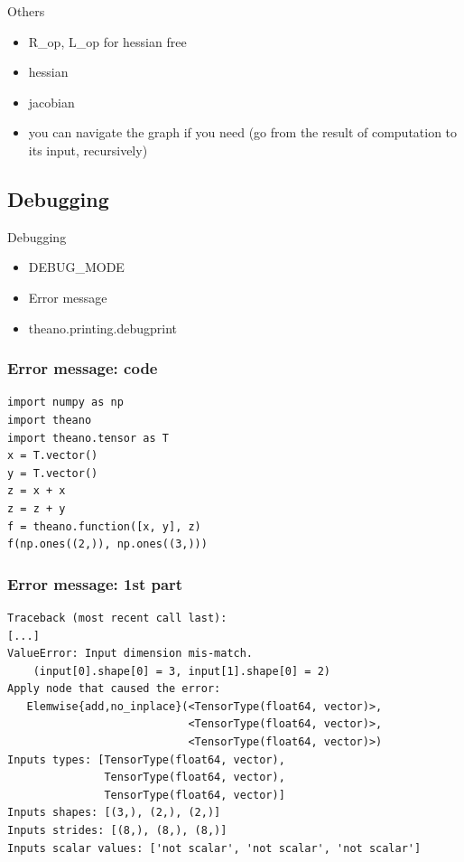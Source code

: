 \documentclass[utf8x,xcolor=pdftex,dvipsnames,table]{beamer}
\begin{document}
\begin{frame}{Others}
  \begin{itemize}
  \item R\_op, L\_op for hessian free
  \item hessian
  \item jacobian
  \item you can navigate the graph if you need
      (go from the result of computation to its input, recursively)
  \end{itemize}
\end{frame}

\subsection{Debugging}
\begin{frame}{Debugging}
  \begin{itemize}
  \item DEBUG\_MODE
  \item Error message
  \item theano.printing.debugprint
  \end{itemize}
\end{frame}

\begin{frame}[fragile]
  \frametitle{Error message: code}
\begin{lstlisting}
import numpy as np
import theano
import theano.tensor as T
x = T.vector()
y = T.vector()
z = x + x
z = z + y
f = theano.function([x, y], z)
f(np.ones((2,)), np.ones((3,)))
\end{lstlisting}
\end{frame}

\begin{frame}[fragile]
  \frametitle{Error message: 1st part}

\begin{lstlisting}
Traceback (most recent call last):
[...]
ValueError: Input dimension mis-match.
    (input[0].shape[0] = 3, input[1].shape[0] = 2)
Apply node that caused the error:
   Elemwise{add,no_inplace}(<TensorType(float64, vector)>,
                            <TensorType(float64, vector)>,
                            <TensorType(float64, vector)>)
Inputs types: [TensorType(float64, vector),
               TensorType(float64, vector),
               TensorType(float64, vector)]
Inputs shapes: [(3,), (2,), (2,)]
Inputs strides: [(8,), (8,), (8,)]
Inputs scalar values: ['not scalar', 'not scalar', 'not scalar']
\end{lstlisting}
\end{frame}
\end{document}

